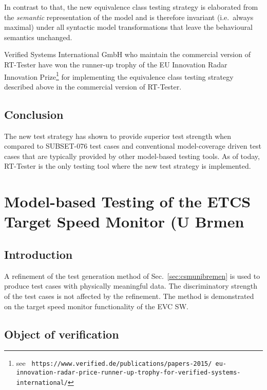 In contrast to that, the new equivalence class testing strategy is elaborated from the
{\it semantic} representation of the model and is therefore invariant (i.e.~always maximal) under all syntactic model transformations that leave the behavioural semantics unchanged.

Verified Systems International GmbH who maintain the commercial
version of RT-Tester have won the runner-up trophy of the EU
Innovation Radar Innovation Prize\footnote{see {\tt
    https://www.verified.de/publications/papers-2015/\newline
    eu-innovation-radar-price-runner-up-trophy-for-verified-systems-international/}}
for implementing the equivalence class testing strategy described
above in the commercial version of RT-Tester.

\section{Conclusion}

The new test strategy has shown to provide superior test strength when compared to
SUBSET-076 test cases and conventional model-coverage driven test cases that are 
typically provided by other model-based testing tools. As of today, RT-Tester is the
only testing tool where the new test strategy is implemented.


\chapter{Model-based Testing of the ETCS Target Speed Monitor (U Brmen}
\label{sec:targetspeedmonitorbremen}

\section{Introduction}
A refinement of the test generation method of
Sec.~\ref{sec:csmunibremen} is used to produce test cases with
physically meaningful data. The discriminatory strength of the test
cases is not affected by the refinement. The method is demonstrated on
the target speed monitor functionality of the EVC SW.

\section{Object of verification}

